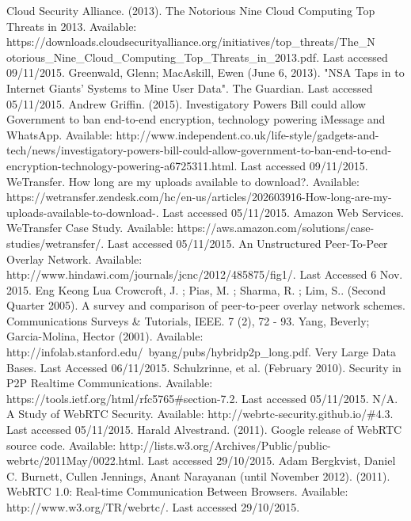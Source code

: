 \documentclass[]{report}
\begin{document}
	\begin{thebibliography}{20}
		Cloud Security Alliance. (2013). The Notorious Nine Cloud Computing Top Threats in 2013. Available: https://downloads.cloudsecurityalliance.org/initiatives/top\_threats/The\_N\\otorious\_Nine\_Cloud\_Computing\_Top\_Threats\_in\_2013.pdf. Last accessed 09/11/2015.
		Greenwald, Glenn; MacAskill, Ewen (June 6, 2013). "NSA Taps in to Internet Giants' Systems to Mine User Data". The Guardian.  Last accessed 05/11/2015.
		Andrew Griffin. (2015). Investigatory Powers Bill could allow Government to ban end-to-end encryption, technology powering iMessage and WhatsApp. Available: http://www.independent.co.uk/life-style/gadgets-and-tech/news/investigatory-powers-bill-could-allow-government-to-ban-end-to-end-encryption-technology-powering-a6725311.html. Last accessed 09/11/2015.
		WeTransfer. How long are my uploads available to download?. Available: https://wetransfer.zendesk.com/hc/en-us/articles/202603916-How-long-are-my-uploads-available-to-download-. Last accessed 05/11/2015.
		Amazon Web Services. WeTransfer Case Study. Available: https://aws.amazon.com/solutions/case-studies/wetransfer/. Last accessed 05/11/2015.
		An Unstructured Peer-To-Peer Overlay Network. Available:
		http://www.hindawi.com/journals/jcnc/2012/485875/fig1/. Last Accessed 6 Nov. 2015.
		Eng Keong Lua Crowcroft, J. ; Pias, M. ; Sharma, R. ; Lim, S.. (Second Quarter 2005). A survey and comparison of peer-to-peer overlay network schemes. Communications Surveys \& Tutorials, IEEE. 7 (2), 72 - 93.
		Yang, Beverly; Garcia-Molina, Hector (2001). Available: http://infolab.stanford.edu/~byang/pubs/hybridp2p\_long.pdf. Very Large Data Bases. Last Accessed 06/11/2015.
		Schulzrinne, et al. (February 2010). Security in P2P Realtime Communications. Available: https://tools.ietf.org/html/rfc5765\#section-7.2. Last accessed 05/11/2015.
		N/A. A Study of WebRTC Security. Available: http://webrtc-security.github.io/\#4.3. Last accessed 05/11/2015.
		Harald Alvestrand. (2011). Google release of WebRTC source code. Available: http://lists.w3.org/Archives/Public/public-webrtc/2011May/0022.html. Last accessed 29/10/2015.
		Adam Bergkvist, Daniel C. Burnett, Cullen Jennings, Anant Narayanan (until November 2012). (2011). WebRTC 1.0: Real-time Communication Between Browsers. Available: http://www.w3.org/TR/webrtc/. Last accessed 29/10/2015.

\end{thebibliography}
\end{document}
